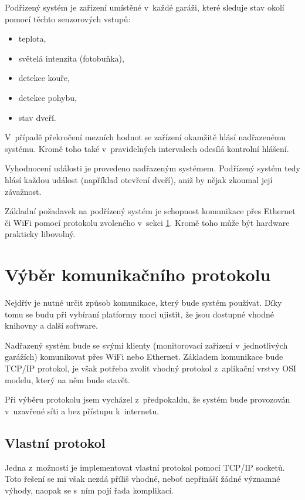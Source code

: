 Podřízený systém je zařízení umístěné v~každé garáži, které sleduje stav okolí pomocí těchto senzorových vstupů:

\begin{itemize}
    \item teplota,
    \item světelá intenzita (fotobuňka),
    \item detekce kouře,
    \item detekce pohybu,
    \item stav dveří.
\end{itemize}

V~případě překročení mezních hodnot se zařízení okamžitě hlásí nadřazenému systému. Kromě toho také v~pravidelných intervalech odesílá kontrolní hlášení. 

Vyhodnocení události je provedeno nadřazeným systémem. Podřízený systém tedy hlásí každou událost (například otevření dveří), aniž by nějak zkoumal její závažnost.

Základní požadavek na podřízený systém je schopnost komunikace přes Ethernet či WiFi pomocí protokolu zvoleného v~sekci \ref{sec:an_protocol}. Kromě toho může být hardware prakticky libovolný.

\section{Výběr komunikačního protokolu}
\label{sec:an_protocol}

Nejdřív je nutné určit způsob komunikace, který bude systém používat. Díky tomu se budu při vybíraní platformy moci ujistit, že jsou dostupné vhodné knihovny a další software. 

Nadřazený systém bude se svými klienty (monitorovací zařízení v~jednotlivých garážích) komunikovat přes WiFi nebo Ethernet. Základem komunikace bude TCP/IP protokol, je však potřeba zvolit vhodný protokol z~aplikační vrstvy OSI modelu, který na něm bude stavět.

Při výběru protokolu jsem vycházel z~předpokaldu, že systém bude provozován v~uzavřené síti a bez přístupu k~internetu. 

\subsection{Vlastní protokol}

Jedna z~možností je implementovat vlastní protokol pomocí TCP/IP socketů. Toto řešení se mi však nezdá příliš vhodné, neboť nepřináší žádné významné výhody, naopak se s~ním pojí řada komplikací.

